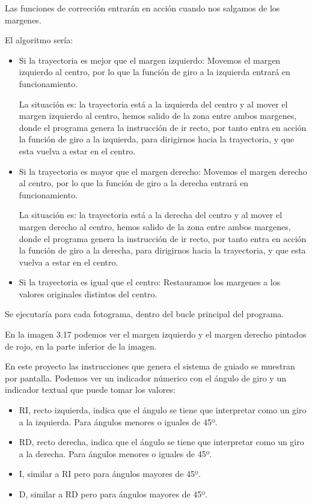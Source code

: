 Las funciones de corrección entrarán en acción cuando nos salgamos de los margenes. 

El algoritmo sería:

\begin{itemize}
	\item Si la trayectoria es mejor que el margen izquierdo:
	Movemos el margen izquierdo al centro, por lo que la función de giro a la izquierda entrará en funcionamiento. 
	
	La situación es: la trayectoria está a la izquierda del centro y al mover el margen izquierdo al centro, hemos salido de la zona entre ambos margenes, donde el programa genera la instrucción de ir recto, por tanto entra en acción la función de giro a la izquierda, para dirigirnos hacia la trayectoria, y que esta vuelva a estar en el centro.
	
	\item Si la trayectoria es mayor que el margen derecho:
	Movemos el margen derecho al centro, por lo que la función de giro a la derecha entrará en funcionamiento. 
	
	La situación es: la trayectoria está a la derecha del centro y al mover el margen derecho al centro, hemos salido de la zona entre ambos margenes, donde el programa genera la instrucción de ir recto, por tanto entra en acción la función de giro a la derecha, para dirigirnos hacia la trayectoria, y que esta vuelva a estar en el centro.
	
	\item Si la trayectoria es igual que el centro:
	Restauramos los margenes a los valores originales distintos del centro.
	
\end{itemize}

Se ejecutaría para cada fotograma, dentro del bucle principal del programa.

En la imagen 3.17 podemos ver el margen izquierdo y el margen derecho pintados de rojo, en la parte inferior de la imagen.

En este proyecto las instrucciones que genera el sistema de guiado se muestran por pantalla. Podemos ver un indicador númerico con el ángulo de giro y un indicador textual que puede tomar los valores:

\begin{itemize}

	\item RI, recto izquierda, indica que el ángulo se tiene que interpretar como un giro a la izquierda. Para ángulos menores o iguales de 45º.
	
	\item RD, recto derecha, indica que el ángulo se tiene que interpretar como un giro a la derecha. Para ángulos menores o iguales de 45º.
	\item I, similar a RI pero para ángulos mayores de 45º.
	
	\item D, similar a RD pero para ángulos mayores de 45º.
	
\end{itemize}

